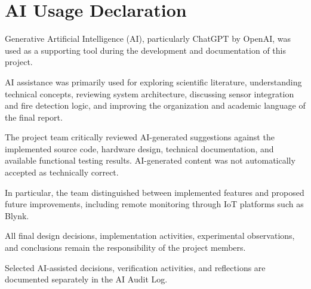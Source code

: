 \documentclass[12pt,a4paper]{article}
\begin{document}
\section*{AI Usage Declaration}

Generative Artificial Intelligence (AI),
particularly ChatGPT by OpenAI, was used
as a supporting tool during the development
and documentation of this project.

AI assistance was primarily used for
exploring scientific literature,
understanding technical concepts,
reviewing system architecture,
discussing sensor integration and
fire detection logic, and improving
the organization and academic language
of the final report.

The project team critically reviewed
AI-generated suggestions against
the implemented source code,
hardware design, technical documentation,
and available functional testing results.
AI-generated content was not automatically
accepted as technically correct.

In particular, the team distinguished
between implemented features and
proposed future improvements, including
remote monitoring through IoT platforms
such as Blynk.

All final design decisions,
implementation activities,
experimental observations,
and conclusions remain the
responsibility of the project members.

Selected AI-assisted decisions,
verification activities, and reflections
are documented separately in the
AI Audit Log.
\end{document}
